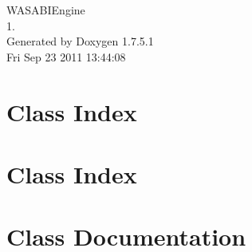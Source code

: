\documentclass[a4paper]{book}
\begin{document}
\hypersetup{pageanchor=false,citecolor=blue}
\begin{titlepage}
\vspace*{7cm}
\begin{center}
{\Large \-W\-A\-S\-A\-B\-I\-Engine \\[1ex]\large 1. }\\
\vspace*{1cm}
{\large \-Generated by Doxygen 1.7.5.1}\\
\vspace*{0.5cm}
{\small Fri Sep 23 2011 13:44:08}\\
\end{center}
\end{titlepage}
\clearemptydoublepage
{}
\tableofcontents
\clearemptydoublepage
{}
\hypersetup{pageanchor=true,citecolor=blue}
\chapter{\-Class \-Index}

\chapter{\-Class \-Index}

\chapter{\-Class \-Documentation}













\printindex
\end{document}
